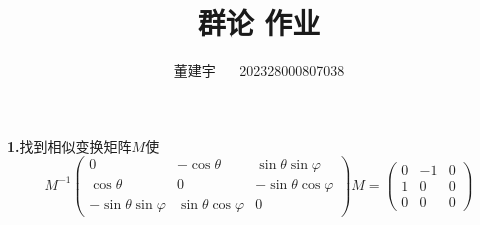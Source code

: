 \documentclass[reqno,a4paper,12pt]{amsart}
\title{群论
作业}
\author{董建宇 ~~ 202328000807038}
\begin{document}
\maketitle
\titleformat{\section}[hang]{\small}{\thesection}{0.8em}{}{}
\titleformat{\subsection}[hang]{\small}{\thesubsection}{0.8em}{}{}

\textbf{1.}找到相似变换矩阵$M$使
\[
	M^{-1}\left(
	\begin{matrix}
		0 & -\cos\theta & \sin\theta\sin\varphi \\
		\cos\theta & 0 & -\sin\theta\cos\varphi \\
		-\sin\theta\sin\varphi & \sin\theta\cos\varphi & 0
	\end{matrix}
	\right)M = \left(
	\begin{matrix}
		0 & -1 & 0 \\
		1 & 0 & 0 \\
		0 & 0 & 0
	\end{matrix}
	\right)
\]
\end{document}

